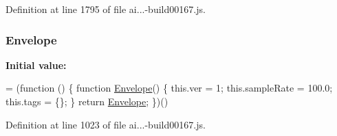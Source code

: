 Definition at line 1795 of file ai...-\/build00167.\+js.

\subsubsection[{\texorpdfstring{Envelope}{Envelope}}]{ Envelope}\hypertarget{_scripts_2ai_80_822_89-build00167_8js_a9823f9c23669cb68ab0acbfa8d2180a7}{}\label{_scripts_2ai_80_822_89-build00167_8js_a9823f9c23669cb68ab0acbfa8d2180a7}
{\bfseries Initial value\+:}
\begin{DoxyCode}
= (\textcolor{keyword}{function} () \{
            \textcolor{keyword}{function} \hyperlink{obj_2_release_2_package_2_package_tmp_2_scripts_2ai_80_822_89-build00167_8js_a9823f9c23669cb68ab0acbfa8d2180a7}{Envelope}() \{
                this.ver = 1;
                this.sampleRate = 100.0;
                this.tags = \{\};
            \}
            \textcolor{keywordflow}{return} \hyperlink{obj_2_release_2_package_2_package_tmp_2_scripts_2ai_80_822_89-build00167_8js_a9823f9c23669cb68ab0acbfa8d2180a7}{Envelope};
        \})()
\end{DoxyCode}


Definition at line 1023 of file ai...-\/build00167.\+js.

